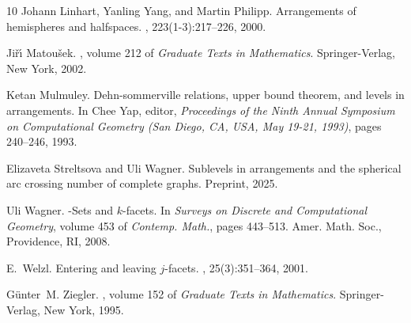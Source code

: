 \documentclass[11pt]{article}
\begin{document}
\begin{thebibliography}{10}
Johann Linhart, Yanling Yang, and Martin Philipp.
\newblock Arrangements of hemispheres and halfspaces.
, 223(1-3):217--226, 2000.

Ji\v{r}\'{\i} Matou\v{s}ek.
, volume 212 of {\em Graduate
  Texts in Mathematics}.
\newblock Springer-Verlag, New York, 2002.

Ketan Mulmuley.
\newblock Dehn-sommerville relations, upper bound theorem, and levels in
  arrangements.
\newblock In Chee Yap, editor, {\em Proceedings of the Ninth Annual Symposium
  on Computational Geometry (San Diego, CA, USA, May 19-21, 1993)}, pages
  240--246, 1993.

Elizaveta Streltsova and Uli Wagner.
\newblock Sublevels in arrangements and the spherical arc crossing number of
  complete graphs.
\newblock Preprint, 2025.

Uli Wagner.
-{S}ets and {$k$}-facets.
\newblock In {\em Surveys on {D}iscrete and {C}omputational {G}eometry}, volume
  453 of {\em Contemp. Math.}, pages 443--513. Amer. Math. Soc., Providence,
  RI, 2008.

E.~Welzl.
\newblock Entering and leaving {$j$}-facets.
, 25(3):351--364, 2001.

G\"{u}nter~M. Ziegler.
, volume 152 of {\em Graduate Texts in
  Mathematics}.
\newblock Springer-Verlag, New York, 1995.

\end{thebibliography}
\end{document}

